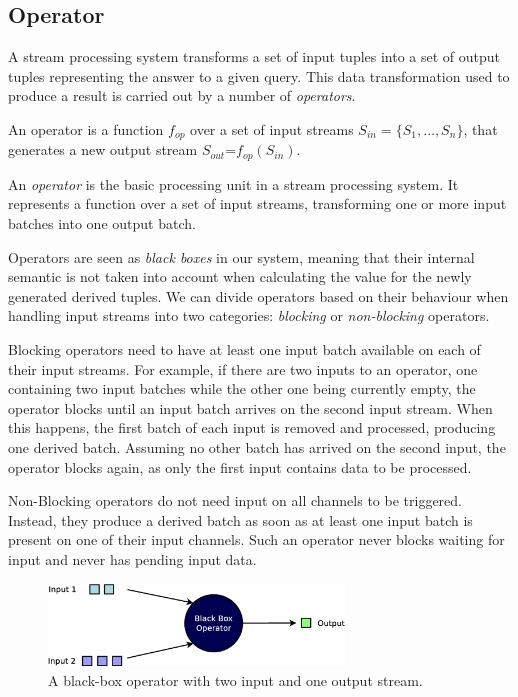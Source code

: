 \subsection*{Operator}
A stream processing system transforms a set of input tuples into a set of output tuples representing the
answer to a given query. This data transformation used to produce a result is carried out by a number
of \emph{operators}.


\begin{definition}[Operator]{
An operator is a function $f_{op}$ over a set of input streams $S_{in}=\{S_1,\dots,S_n\}$,
that generates a new output stream $S_{out}$=$f_{op}(S_{in})$. 
}
\end{definition}
 
An \textit{operator} is the basic processing unit in a stream processing system. It represents a
function over a set of input streams, transforming  one or more input batches into one output batch. 

Operators are seen as \textit{black boxes} in our system, meaning that their internal semantic is not
taken into account when calculating the \qm value for the newly generated derived tuples.
We can divide operators based on their behaviour when handling input streams into two categories:
\textit{blocking} or \textit{non-blocking} operators.

Blocking operators need to have at least one input batch available on each of their input
streams. For example, if there are two inputs to an operator, one containing two input
batches while the other one being currently empty, the operator blocks until an
input batch arrives on the second input stream. When this happens, the first batch of each input is removed and processed,
producing one derived batch. Assuming no other batch has arrived on the second input, the operator
blocks again, as only the first input contains data to be processed.

Non-Blocking operators do not need input on all channels to be triggered. Instead, they produce
a derived batch as soon as at least one input batch is present on one of their input channels. 
Such an operator never blocks waiting for input and never has pending input data.

\begin{figure}[b!]
	\centering
	\includegraphics[width=0.7\textwidth]{img/tesi/operator} 
	\caption{A black-box operator with two input and one output stream.}
	\label{fig:tuple}
\end{figure}

